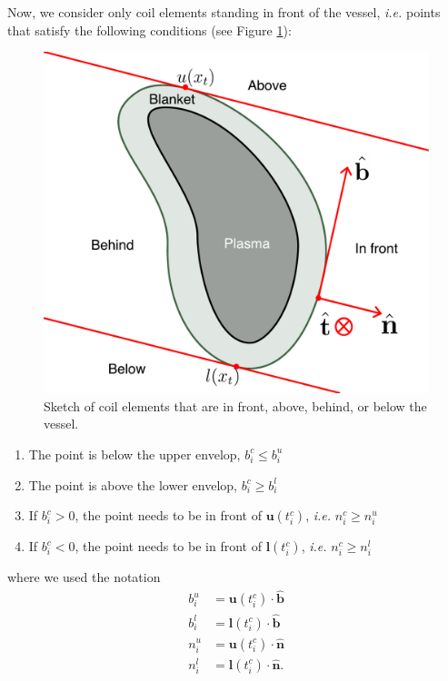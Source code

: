 \documentclass[12pt]{article}
\begin{document}
Now, we consider only coil elements standing in front of the vessel, \textit{i.e.} points that satisfy the following conditions (see Figure \ref{fig.sketch_condition}):
\begin{figure}
    \centering
    \includegraphics[width=\textwidth]{figures/position_relative_to_vessel.pdf}
    \caption{Sketch of coil elements that are in front, above, behind, or below the vessel.}
    \label{fig.sketch_condition}
\end{figure}
\begin{enumerate}
    \item The point is below the upper envelop, $b^c_i\leq b^u_i$
    \item The point is above the lower envelop, $b^c_i\geq b^l_i$
    \item If $b^c_i>0$, the point needs to be in front of $\mathbf{u}(t^c_i)$, \textit{i.e.} $n^c_i\geq n^u_i$
    \item If $b^c_i<0$, the point needs to be in front of $\mathbf{l}(t^c_i)$, \textit{i.e.} $n^c_i\geq n^l_i$
\end{enumerate}
where we used the notation 
\begin{align}
    b^u_i &= \mathbf{u}(t^c_i)\cdot\hat{\mathbf{b}}\\
    b^l_i &= \mathbf{l}(t^c_i)\cdot\hat{\mathbf{b}}\\
    n^u_i &= \mathbf{u}(t^c_i)\cdot\hat{\mathbf{n}}\\
    n^l_i &= \mathbf{l}(t^c_i)\cdot\hat{\mathbf{n}}.
\end{align}
\end{document}
